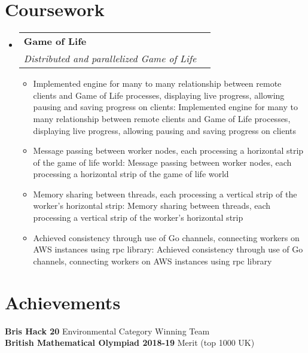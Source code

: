 \documentclass[a4paper,11pt]{article}
\makeatletter
\def \ifempty#1{\def\temp{#1} \ifx\temp\empty }
\newcommand{\resumeItem}[2]{
  \item\small{
  	\ifempty{#1}#2\else\textbf{#1}{: #2 \vspace{-2pt}}\fi
  }
}
\newcommand{\resumeSubheading}[4]{
  \vspace{-1pt}\item
    \begin{tabular*}{0.97\textwidth}{l@{\extracolsep{\fill}}r}
      \textbf{#1} & #2 \\
      \textit{\small#3} & \textit{\small #4} \\
    \end{tabular*}\vspace{-5pt}
}
\newcommand{\resumeSubHeadingListStart}{\begin{itemize}[leftmargin=*]}
\newcommand{\resumeSubHeadingListEnd}{\end{itemize}}
\newcommand{\resumeItemListStart}{\begin{itemize}}
\newcommand{\resumeItemListEnd}{\end{itemize}\vspace{-5pt}}
\makeatother
\begin{document}
\section{Coursework}
  \resumeSubHeadingListStart
    \resumeSubheading
      {Game of Life}{}
      {Distributed and parallelized Game of Life}{}
      \resumeItemListStart
        \resumeItem{}
          {Implemented engine for many to many relationship between remote clients and Game of Life processes, displaying live progress, allowing pausing and saving progress on clients}
        \resumeItem{}
          {Message passing between worker nodes, each processing a horizontal strip of the game of life world}
        \resumeItem{}
          {Memory sharing between threads, each processing a vertical strip of the worker's horizontal strip}
        \resumeItem{}
          {Achieved consistency through use of Go channels, connecting workers on AWS instances using rpc library}
      \resumeItemListEnd
  \resumeSubHeadingListEnd


\section{Achievements}
  \textbf{Bris Hack 20}{ Environmental Category Winning Team} \\
  \textbf{British Mathematical Olympiad 2018-19}{ Merit (top 1000 UK)} \\
  
  
\end{document}

